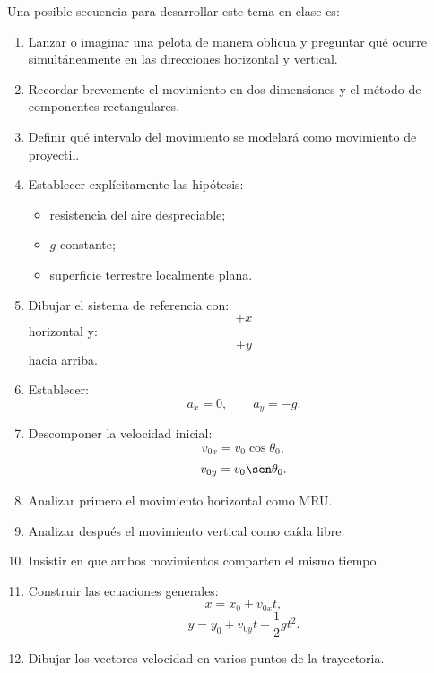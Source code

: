\begin{notapedagogica}
Una posible secuencia para desarrollar este tema en clase es:

\begin{enumerate}
    \item Lanzar o imaginar una pelota de manera oblicua y preguntar qué ocurre
    simultáneamente en las direcciones horizontal y vertical.

    \item Recordar brevemente el movimiento en dos dimensiones y el método de
    componentes rectangulares.

    \item Definir qué intervalo del movimiento se modelará como movimiento de
    proyectil.

    \item Establecer explícitamente las hipótesis:
    \begin{itemize}
        \item resistencia del aire despreciable;
        \item \(g\) constante;
        \item superficie terrestre localmente plana.
    \end{itemize}

    \item Dibujar el sistema de referencia con:
    \[
    +x
    \]
    horizontal y:
    \[
    +y
    \]
    hacia arriba.

    \item Establecer:
    \[
    a_x=0,
    \qquad
    a_y=-g.
    \]

    \item Descomponer la velocidad inicial:
    \[
    v_{0x}=v_0\cos\theta_0,
    \]
    \[
    v_{0y}=v_0\sen\theta_0.
    \]

    \item Analizar primero el movimiento horizontal como MRU.

    \item Analizar después el movimiento vertical como caída libre.

    \item Insistir en que ambos movimientos comparten el mismo tiempo.

    \item Construir las ecuaciones generales:
    \[
    x=x_0+v_{0x}t,
    \]
    \[
    y=y_0+v_{0y}t-\frac{1}{2}gt^2.
    \]

    \item Dibujar los vectores velocidad en varios puntos de la trayectoria.


\end{enumerate}
\end{notapedagogica}
